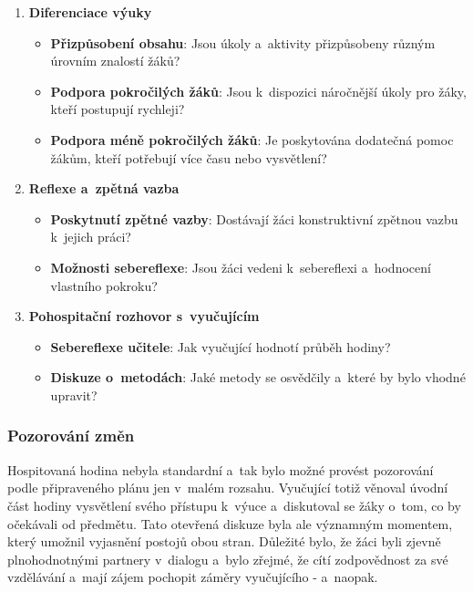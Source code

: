 \begin{enumerate}
    \item \textbf{Diferenciace výuky}
    \begin{itemize}
        \item \textbf{Přizpůsobení obsahu}: Jsou úkoly a~aktivity přizpůsobeny různým úrovním znalostí žáků?
        \item \textbf{Podpora pokročilých žáků}: Jsou k~dispozici náročnější úkoly pro žáky, kteří postupují rychleji?
        \item \textbf{Podpora méně pokročilých žáků}: Je poskytována dodatečná pomoc žákům, kteří potřebují více času nebo vysvětlení?
    \end{itemize}

    \item \textbf{Reflexe a~zpětná vazba}
    \begin{itemize}
        \item \textbf{Poskytnutí zpětné vazby}: Dostávají žáci konstruktivní zpětnou vazbu k~jejich práci?
        \item \textbf{Možnosti sebereflexe}: Jsou žáci vedeni k~sebereflexi a~hodnocení vlastního pokroku?
    \end{itemize}

    \item \textbf{Pohospitační rozhovor s~vyučujícím}
    \begin{itemize}
        \item \textbf{Sebereflexe učitele}: Jak vyučující hodnotí průběh hodiny?
        \item \textbf{Diskuze o~metodách}: Jaké metody se osvědčily a~které by bylo vhodné upravit?
    \end{itemize}

\end{enumerate}

\subsubsection*{Pozorování změn}

Hospitovaná hodina nebyla standardní a~tak bylo možné provést pozorování podle připraveného plánu jen v~malém rozsahu. Vyučující totiž věnoval úvodní část hodiny vysvětlení svého přístupu k~výuce a~diskutoval se žáky o~tom, co by očekávali od předmětu. Tato otevřená diskuze byla ale významným momentem, který umožnil vyjasnění postojů obou stran. Důležité bylo, že žáci byli zjevně plnohodnotnými partnery v~dialogu a~bylo zřejmé, že cítí zodpovědnost za své vzdělávání a~mají zájem pochopit záměry vyučujícího - a~naopak.

